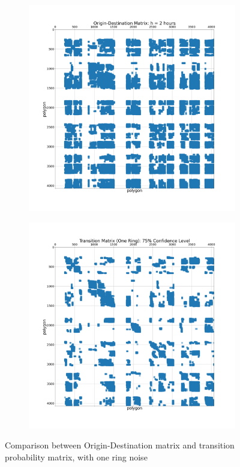 \documentclass[12pt]{article}
\theoremstyle{definition}
\begin{document}
\begin{figure}
  \centering
  \begin{subfigure}[t]{0.45\textwidth}
    \includegraphics[width=\textwidth]{OD.png}
    \caption{}
  \end{subfigure}
  \begin{subfigure}[t]{0.45\textwidth}
    \includegraphics[width=\textwidth]{TM_1.png}
    \caption{}
  \end{subfigure}

  \caption{Comparison between Origin-Destination matrix and transition probability matrix, with one ring noise}
  \label{fig:od}
\end{figure}
\end{document}
